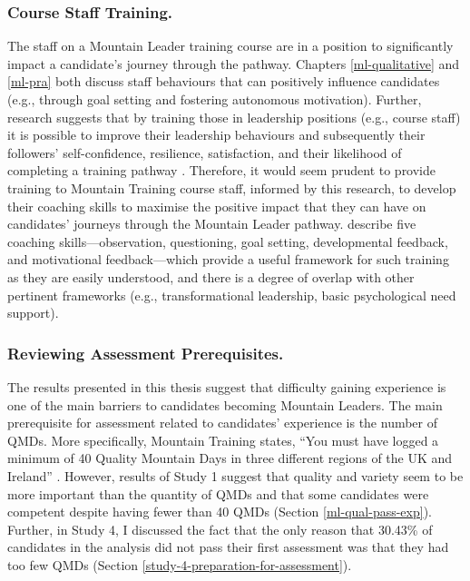 \documentclass[
  12pt,
  a4paper,
]{book}
\begin{document}
\hypertarget{course-staff-training.}{%
\subsubsection{Course Staff Training.}\label{course-staff-training.}}

The staff on a Mountain Leader training course are in a position to significantly impact a candidate's journey through the pathway. Chapters \ref{ml-qualitative} and \ref{ml-pra} both discuss staff behaviours that can positively influence candidates (e.g., through goal setting and fostering autonomous motivation). Further, research suggests that by training those in leadership positions (e.g., course staff) it is possible to improve their leadership behaviours and subsequently their followers' self-confidence, resilience, satisfaction, and their likelihood of completing a training pathway \citep[cf.~][]{Hardy2010}. Therefore, it would seem prudent to provide training to Mountain Training course staff, informed by this research, to develop their coaching skills to maximise the positive impact that they can have on candidates' journeys through the Mountain Leader pathway. \citet{Wagstaff2018} describe five coaching skills---observation, questioning, goal setting, developmental feedback, and motivational feedback---which provide a useful framework for such training as they are easily understood, and there is a degree of overlap with other pertinent frameworks (e.g., transformational leadership, basic psychological need support).

\hypertarget{reviewing-assessment-prerequisites.}{%
\subsubsection{Reviewing Assessment Prerequisites.}\label{reviewing-assessment-prerequisites.}}

The results presented in this thesis suggest that difficulty gaining experience is one of the main barriers to candidates becoming Mountain Leaders. The main prerequisite for assessment related to candidates' experience is the number of QMDs. More specifically, Mountain Training states, ``You must have logged a minimum of 40 Quality Mountain Days in three different regions of the UK and Ireland'' \citep[p 6]{MTUK2015a}. However, results of Study 1 suggest that quality and variety seem to be more important than the quantity of QMDs and that some candidates were competent despite having fewer than 40 QMDs (Section \ref{ml-qual-pass-exp}). Further, in Study 4, I discussed the fact that the only reason that 30.43\% of candidates in the analysis did not pass their first assessment was that they had too few QMDs (Section \ref{study-4-preparation-for-assessment}).
\end{document}
